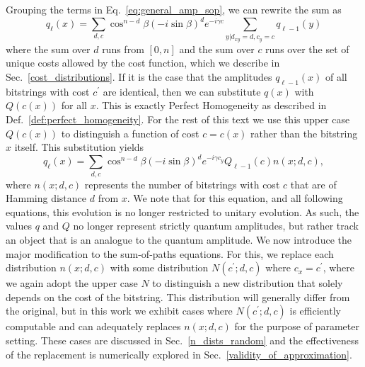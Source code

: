 \documentclass[superscriptaddress,pra,aps,10pt,longbibliography,notitlepage]{revtex4-1}
\newcommand*\cp{c^\prime}
\begin{document}
Grouping the terms in Eq.~\eqref{eq:general_amp_sop}, we can rewrite the sum as 
\begin{equation}
    q_{\ell}(x) = \sum_{d,c}  \cos^{n-d}\beta(-i\sin\beta)^d e^{-i\gamma c} \sum_{y|d_{xy}=d, c_y=c} q_{\ell-1}(y)
\end{equation}
where the sum over $d$ runs from $[0,n]$ and the sum over $c$ runs over the set of unique costs allowed by the cost function, which we describe in Sec.~\ref{cost_distributions}. If it is the case that the amplitudes $q_{\ell-1}(x)$ of all bitstrings with cost $\cp$ are identical, then we can substitute $q(x)$ with $Q(c(x))$ for all $x$. This is exactly Perfect Homogeneity as described in Def.~\ref{def:perfect_homogeneity}. For the rest of this text we use this upper case $Q(c(x))$ to distinguish a function of cost $c=c(x)$ rather than the bitstring $x$ itself. This substitution yields
\begin{equation}\label{eq:pre_homog_sop}
    q_{\ell}(x) = \sum_{d,c}  \cos^{n-d}\beta(-i\sin\beta)^d e^{-i\gamma c_y} Q_{\ell-1}(c) n(x;d,c),
\end{equation}
where $n(x;d,c)$ represents the number of bitstrings with cost $c$ that are of Hamming distance $d$ from $x$. We note that for this equation, and all following equations, this evolution is no longer restricted to unitary evolution. As such, the values $q$ and $Q$ no longer represent strictly quantum amplitudes, but rather track an object that is an analogue to the quantum amplitude. We now introduce the major modification to the sum-of-paths equations. For this, we replace each distribution $n(x;d,c)$ with some distribution $N(\cp;d,c)$ where $c_x=\cp$, where we again adopt the upper case $N$ to distinguish a new distribution that solely depends on the cost of the bitstring. This distribution will generally differ from the original, but in this work we exhibit cases where $N(\cp;d,c)$ is efficiently computable and can adequately replaces $n(x;d,c)$ for the purpose of parameter setting. These cases are discussed in Sec.~\ref{n_dists_random} and the effectiveness of the replacement is numerically explored in Sec.~\ref{validity_of_approximation}.
\end{document}
